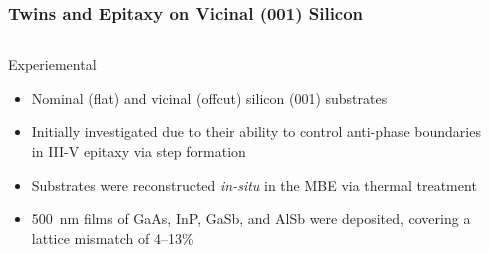 \documentclass[]{beamer}%
\begin{document}
\begin{frame}
    \frametitle{Twins and Epitaxy on Vicinal (001) Silicon}
        \begin{columns}
            \begin{column}{0.5\textwidth}
                \begin{block}{Experiemental}
                    \begin{itemize}[<+-| alert@+>]
                        \item Nominal (flat) and vicinal (offcut) silicon (001) substrates
                        \item Initially investigated due to their ability to control anti-phase boundaries in III-V epitaxy via step formation
                        \item Substrates were reconstructed \textit{in-situ} in the MBE via thermal treatment
                        \item 500~nm films of GaAs, InP, GaSb, and AlSb were deposited, covering a lattice mismatch of 4--13\%
                    \end{itemize}
                \end{block}
            \end{column}
            \begin{column}{0.5\textwidth}
                \centering
                 \\

\end{column}
\end{columns}
\end{frame}
\end{document}
